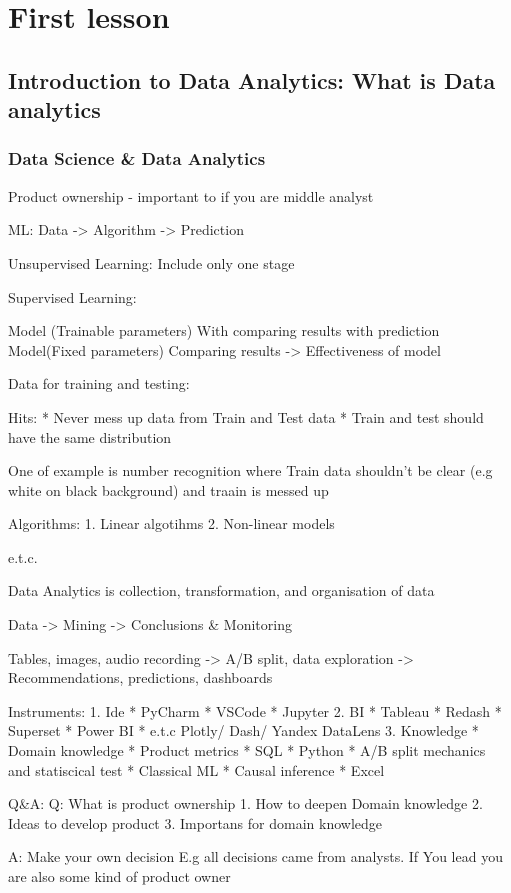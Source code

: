 \documentclass[12pt, a4paper, oneside]{article}
\begin{document}
\section{First lesson}
\subsection{Introduction to Data Analytics: What is Data analytics}
\subsubsection{Data Science \& Data Analytics}
Product ownership - important to  if you are middle analyst   

ML: Data -> Algorithm -> Prediction 

Unsupervised Learning:
Include only one stage 

Supervised Learning:

Model (Trainable parameters)
With comparing results with prediction 
Model(Fixed parameters) 
Comparing results -> Effectiveness of model 

Data for training and testing:

Hits: 
* Never mess up data from Train and Test data
* Train and test should have the same distribution

One of example is number recognition 
where Train data shouldn't be clear (e.g white on black background) and traain is messed up 

Algorithms:
1. Linear algotihms
2. Non-linear models

e.t.c.

Data Analytics is collection, transformation, and organisation of data

Data -> Mining -> Conclusions & Monitoring 

Tables, images, audio recording -> A/B split, data exploration -> Recommendations, predictions, dashboards


Instruments: 
1. Ide
* PyCharm 
* VSCode
* Jupyter
2. BI
* Tableau
* Redash
* Superset
* Power BI 
* e.t.c Plotly/ Dash/ Yandex DataLens
3. Knowledge
* Domain knowledge
* Product metrics
* SQL
* Python
* A/B split mechanics and statiscical test
* Classical ML
* Causal inference
* Excel 


Q&A:
Q: What is product ownership 
1. How to deepen Domain knowledge
2. Ideas to develop product 
3. Importans for domain knowledge 

A: 
Make your own decision
E.g all decisions came from analysts. If You lead you are also some kind of product owner 
\end{document}

